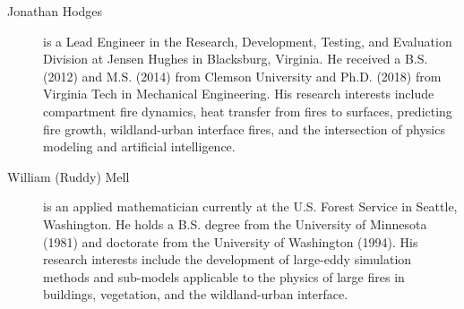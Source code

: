 \begin{description}
\item[Jonathan Hodges] is a Lead Engineer in the Research, Development, Testing, and Evaluation Division at Jensen Hughes in Blacksburg, Virginia. He received a B.S. (2012) and M.S. (2014) from Clemson University and Ph.D. (2018) from Virginia Tech in Mechanical Engineering. His research interests include compartment fire dynamics, heat transfer from fires to surfaces, predicting fire growth, wildland-urban interface fires, and the intersection of physics modeling and artificial intelligence.




\item[William (Ruddy) Mell] is an applied mathematician currently at the U.S. Forest Service in Seattle, Washington. He holds a B.S. degree from the University of Minnesota (1981) and doctorate from the University of Washington (1994). His research interests include the development of large-eddy simulation methods and sub-models applicable to the physics of large fires in buildings, vegetation, and the wildland-urban interface.


\end{description}
